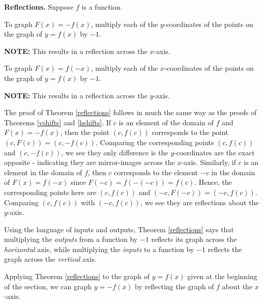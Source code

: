 \documentclass{ximera}
\begin{document}
\smallskip



\begin{theorem} \label{reflections}\textbf{Reflections.}  Suppose $f$ is a function. 

  To graph $F(x)=-f(x)$,  multiply each of the $y$-coordinates of the points on the graph of $y=f(x)$ by $-1$.

\textbf{NOTE:}  This results in a reflection across the $x$-axis.

To graph $F(x)=f(-x)$,  multiply each of the $x$-coordinates of the points on the graph of $y=f(x)$ by $-1$.

\textbf{NOTE:}  This results in a reflection across the $y$-axis.


\end{theorem}


\smallskip

The proof of Theorem \ref{reflections} follows in much the same way as the proofs of Theorems \ref{vshifts} and \ref{hshifts}.  If $c$ is an element of the domain of $f$ and $F(x) = -f(x)$,  then the point $(c, f(c))$ corresponds to the point $(c, F(c)) = (c,-f(c))$.  Comparing the corresponding points $(c, f(c))$ and $(c, -f(c))$, we see they only difference is the $y$-coordinates are the exact opposite - indicating they are mirror-images across the $x$-axis.  Similarly, if $c$ is an element in the domain of $f$, then $c$ corresponds to the element $-c$ in the domain of $F(x) = f(-x)$ since $F(-c) = f(-(-c)) = f(c)$. Hence, the corresponding points here are $(c, f(c))$ and $(-c, F(-c)) = (-c, f(c))$.  Comparing $(c, f(c))$ with $(-c, f(c))$, we see they are reflections about the $y$-axis.

\smallskip

Using the  language of inputs and outputs, Theorem \ref{reflections} says that multiplying the \textit{outputs} from a function by $-1$ reflects its graph across the \textit{horizontal} axis, while multiplying the \textit{inputs} to a function by $-1$ reflects the graph across the \textit{vertical} axis.

\smallskip

Applying Theorem \ref{reflections} to the graph of $y=f(x)$ given at the beginning of the section, we can graph $y=-f(x)$ by reflecting the graph of $f$ about the $x$-axis.
\end{document}
